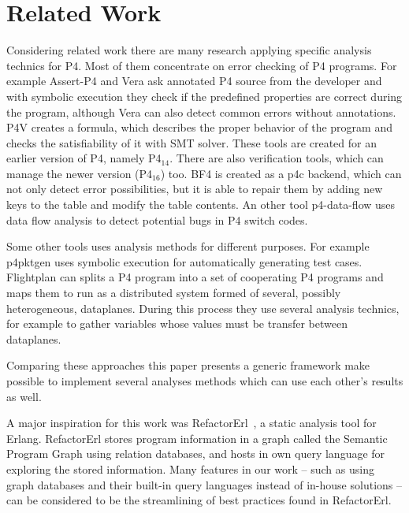 \documentclass[sigconf]{acmart}
\begin{document}
	\section{Related Work}
	\label{sec:related}
	
	
	Considering related work there are many research applying specific analysis technics for P4. Most of them concentrate on error checking of P4 programs. For example Assert-P4 \cite{assertp4} and Vera \cite{vera} ask annotated P4 source from the developer and with symbolic execution they check if the predefined properties are correct during the program, although Vera can also detect common errors without annotations. P4V \cite{p4v} creates a formula, which describes the proper behavior of the program and checks the satisfiability of it with SMT solver. These tools are created for an earlier version of P4, namely P4$_\text{14}$. There are also verification tools, which can manage the newer version (P4$_\text{16}$) too. BF4 \cite{bf4} is created as a p4c backend, which can not only detect error possibilities, but it is able to repair them by adding new keys to the table and modify the table contents. An other tool p4-data-flow \cite{p4dataflow} uses data flow analysis to detect potential bugs in P4 switch codes.
	
	Some other tools uses analysis methods for different purposes. For example p4pktgen \cite{p4pktgen} uses symbolic execution for automatically generating test cases. Flightplan \cite{flightplan} can splits a P4 program into a set of cooperating P4 programs and maps them to run as a distributed system formed of several, possibly heterogeneous, dataplanes. During this process they use several analysis technics, for example to gather variables whose values must be transfer between dataplanes. 

	Comparing these approaches this paper presents a generic framework make possible to implement several analyses methods which can use each other's results as well. 
	

  A major inspiration for this work was RefactorErl~\cite{referl}, a static analysis tool for Erlang. RefactorErl stores program information in a graph called the Semantic Program Graph using relation databases, and hosts in own query language for exploring the stored information. Many features in our work -- such as using graph databases and their built-in query languages instead of in-house solutions -- can be considered to be the streamlining of best practices found in RefactorErl.
\end{document}
